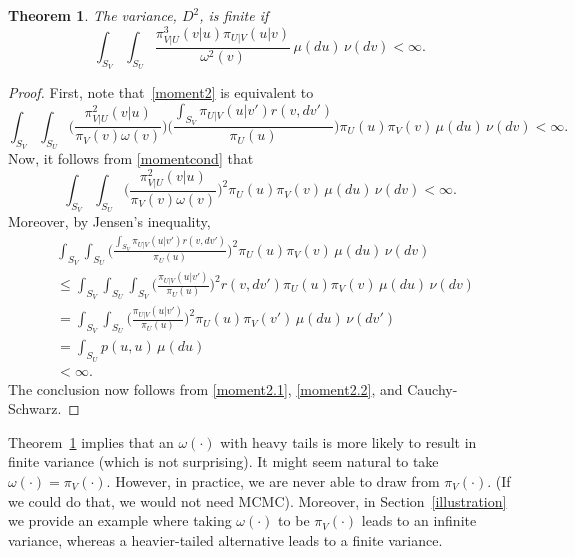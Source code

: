 \documentclass[11pt]{article}
\newtheorem{theorem}{Theorem}
\begin{document}
	\begin{theorem} \label{secondmoment}
		The variance, $D^2$, is finite if
		\begin{equation} \label{momentcond}
		\int_{S_V} \int_{S_U} \frac{\pi_{V|U}^3(v|u) \pi_{U|V}(u|v)} {\omega^2(v)} \, \mu(du) \,\nu(dv) < \infty.
		\end{equation}
	\end{theorem}
	\begin{proof}
          First, note that~\eqref{moment2} is equivalent to
		\begin{equation*}
		\int_{S_V} \int_{S_U} \bigg(\frac{\pi^2_{V|U}(v|u)}{\pi_V(v)\omega(v)}\bigg) \bigg( \frac{\int_{S_V} \pi_{U|V}(u|v') r(v,dv')}{\pi_U(u)} \bigg) \pi_U(u)\pi_V(v) \, \mu(du)\,\nu(dv) < \infty.
		\end{equation*}
		Now, it follows from \eqref{momentcond} that
		\begin{equation} \label{moment2.1}
		\int_{S_V} \int_{S_U} \bigg(\frac{\pi^2_{V|U}(v|u)}{\pi_V(v)\omega(v)}\bigg)^2 \pi_U(u)\pi_V(v) \, \mu(du)\,\nu(dv) < \infty.
		\end{equation}
		Moreover, by Jensen's inequality,
		\begin{equation} \label{moment2.2}
		\begin{aligned}
		&\int_{S_V} \int_{S_U} \bigg( \frac{\int_{S_V} \pi_{U|V}(u|v') r(v,dv')}{\pi_U(u)} \bigg)^2 \pi_U(u)\pi_V(v) \, \mu(du)\,\nu(dv) \\
		& \leq \int_{S_V} \int_{S_U} \int_{S_V} \bigg( \frac{\pi_{U|V}(u|v')}{\pi_U(u)} \bigg)^2 r(v,dv') \pi_U(u)\pi_V(v) \, \mu(du)\,\nu(dv) \\
		&= \int_{S_V} \int_{S_U} \bigg( \frac{\pi_{U|V}(u|v')}{\pi_U(u)} \bigg)^2 \pi_U(u)\pi_V(v') \, \mu(du)\,\nu(dv') \\
		&= \int_{S_U} p(u,u) \, \mu(du) \\
		& < \infty.
		\end{aligned}
		\end{equation}
		The conclusion now follows from \eqref{moment2.1},
                \eqref{moment2.2}, and Cauchy-Schwarz.
	\end{proof}
	
	Theorem~\ref{secondmoment} implies that an $\omega(\cdot)$
        with heavy tails is more likely to result in finite variance
        (which is not surprising). It might seem natural to take
        $\omega(\cdot) = \pi_V(\cdot)$.  However, in practice, we are
        never able to draw from $\pi_V(\cdot)$.  (If we could do that,
        we would not need MCMC).  Moreover, in
        Section~\ref{illustration} we provide an example where taking
        $\omega(\cdot)$ to be $\pi_V(\cdot)$ leads to an infinite
        variance, whereas a heavier-tailed alternative leads to a
        finite variance.
	
\end{document}
